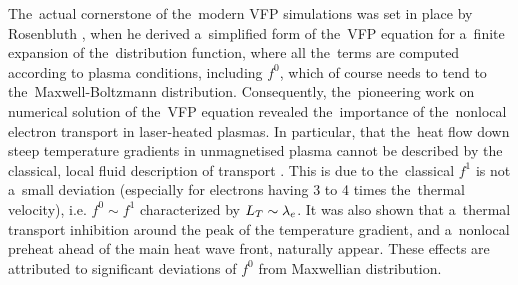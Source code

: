 The~actual cornerstone of the~modern VFP simulations was set in place
by Rosenbluth \cite{Rosenbluth_PR1957}, when he derived a~simplified form 
of the~VFP equation for a~finite expansion of the~distribution function,
where all the~terms are computed according to plasma conditions, including
$f^0$, which of course needs to tend to the~Maxwell-Boltzmann distribution.
Consequently, the~pioneering work on numerical solution of the~VFP equation
\cite{Bell_1981_83, Matte_1982_86} revealed the~importance of the~nonlocal
electron transport in laser-heated plasmas. 
In particular, that the~heat flow down steep temperature gradients in 
unmagnetised plasma cannot be described by the classical, local fluid
description of transport \cite{SpitzerHarm_PR1953, Braginskii_1965_3}.
This is due to the~classical $f^1$ is not a~small deviation 
(especially for electrons having 3 to 4 times the~thermal velocity), 
i.e. $f^0\sim f^1$ characterized by $L_T\sim\lambda_e$.
It was also shown that a~thermal transport inhibition \cite{Bell_1981_83} 
around the peak of the temperature gradient, and a~nonlocal preheat 
ahead of the main heat wave front, naturally appear. 
These effects are attributed to significant deviations 
of $f^0$ from Maxwellian distribution.





